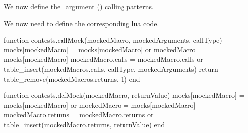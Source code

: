 \startMkIVCode
\def\defTexMockZero#1#2{%
  \directlua{thirddata.contests.defMock('#1', '#2')}%
  \setvalue{#1}{%
    \directlua{%
      thirddata.contests.callMock('#1', { }, 'tex')
    }
  }
}

\def\defTexMockOne#1#2{%
  \directlua{thirddata.contests.defMock('#1', '#2')}%
  \setvalue{#1}#2{%
    \directlua{%
      thirddata.contests.callMock('#1', { '#2' }, 'tex')
    }
  }
}

\def\defTexMockTwo#1#2{%
  \directlua{thirddata.contests.defMock('#1', '#2')}%
  \setvalue{#1}#2#3{%
    \directlua{%
      thirddata.contests.callMock('#1', { '#2', '#3' }, 'tex')
    }
  }
}

\def\defTexMockThree#1#2{%
  \directlua{thriddata.contests.defMock('#1', '#2')}
  \setvalue{#1}#2#3#4{%
    \directlua{%
      thirddata.contests.callMock('#1', { '#2', '#3', '#4' }, 'tex')
    }
  }
}
\stopMkIVCode

We now define the \ConTeXt\ argument () calling patterns. 

\startMkIVCode
\def\defContextMock#1#2{%
  \directlua{thirddata.contests.defMock('#1', '#2')}
  \setuvalue{#1}{%
    \dotripleempty\getvalue{#1Direct}%
  }
  \setuvalue{#1Direct}{%
    \ifthirdargument%
      \expandafter\getvalue{#1Triple}
    \else\ifsecondargument%
      \expandafter\getvalue{#1Double}
    \else\iffirstargument%
      \expandafter\getvalue{#1Single}
    \else%
      \expandafter\getvalue{#1None}
    \fi\fi\fi%
  }
  \setuvalue{#1Triple}[#3][#4][#5]{
    \directlua{%
      thirddata.contests.callMock('#1', { '#3', '#4', '#5' }, 'context')
    }
  }
  \setuvalue{#1Double}[#3][#4]{
    \directlua{%
      thirddata.contests.callMock('#1', { '#3', '#3' }, 'context')
    }
  }
  \setuvalue{#1Single}[#3]{
    \directlua{%
      thirddata.contests.callMock('#1', { '#3' }, 'context')
    }
  }
  \setuvalue{#1None}{
    \directlua{%
      thirddata.contests.callMock('#1', { }, 'context')
    }
  }
}
\stopMkIVCode

We now need to define the corresponding lua code.

\startLuaCode
function contests.callMock(mockedMacro, mockedArguments, callType)
  mocks[mockedMacro] = mocks[mockedMacro] or { }
  mockedMacro = mocks[mockedMacro]
  mockedMacro.calls = mockedMacro.calls or { }
  table_insert(mockedMacros.calls, { callType, mockedArguments})
  return table_remove(mockedMacros.returns, 1)
end

function contests.defMock(mockedMacro, returnValue)
  mocks[mockedMacro] = mocks[mockedMacro] or { }
  mockedMacro = mocks[mockedMacro]
  mockedMacro.returns = mockedMacro.returns or { }
  table_insert(mockedMacro.returns, returnValue)
end
\stopLuaCode

